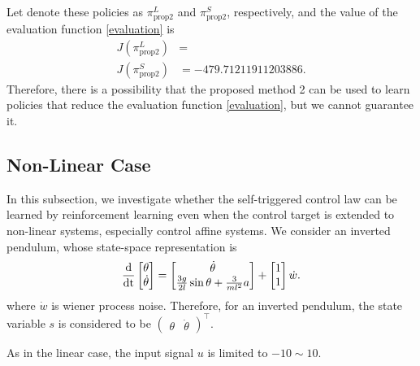 \documentclass[english, dvipdfmx]{ampmt}             %
\newcommand{\odif}[2]{\frac{\rm{d}#1}{\rm{d}#2}}
\begin{document}
Let denote these policies as $\pi_{\textrm{prop}2}^L$ and $\pi_{\textrm{prop}2}^S$, respectively, and the value of the evaluation function \eqref{evaluation} is 
\begin{align}
	J(\pi_{\textrm{prop}2}^L) &= \\
	J(\pi_{\textrm{prop}2}^S) &= -479.71211911203886.
\end{align}
Therefore, there is a possibility that the proposed method 2 can be used to learn policies that reduce the evaluation function \eqref{evaluation}, but we cannot guarantee it. 
\fi

\subsection{Non-Linear Case}
In this subsection, we investigate whether the self-triggered control law can be learned by reinforcement learning even when the control target is extended to non-linear systems, especially control affine systems. We consider an inverted pendulum, whose state-space representation is
\begin{equation}
	\odif{}{t}\begin{bmatrix}\theta \\ \dot{\theta}\end{bmatrix} = 
		\begin{bmatrix}\dot{\theta} \\ \frac{3g}{2l}\sin{\theta} + \frac{3}{ml^2}a \end{bmatrix} + \begin{bmatrix}1 \\ 1\end{bmatrix}\dot{w}\label{pendulum}.
\end{equation}
where $\dot{w}$ is wiener process noise. Therefore, for an inverted pendulum, the state variable $s$ is considered to be $\begin{pmatrix}\theta & \dot{\theta}\end{pmatrix}^{\top}$.
\par
As in the linear case, the input signal $u$ is limited to $-10 \sim 10$.
\end{document}
